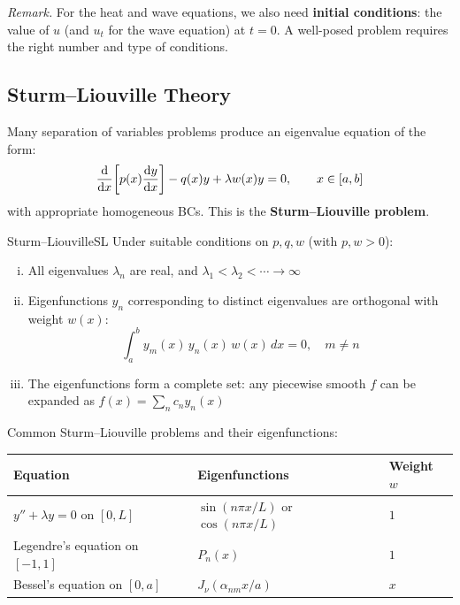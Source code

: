 \documentclass[11pt, letterpaper]{article}
\theoremstyle{plain}
\newenvironment{remark}{\smallskip\noindent\textit{Remark.}}{\smallskip}
\begin{document}
\begin{remark}
    For the heat and wave equations, we also need \textbf{initial conditions}:
    the value of $u$ (and $u_t$ for the wave equation) at $t=0$.
    A well-posed problem requires the right number and type of conditions.
\end{remark}


\subsection{Sturm--Liouville Theory}

Many separation of variables problems produce an eigenvalue equation of the form:
\[
    \dv{}{x}\!\left[p(x)\dv{y}{x}\right] - q(x)y + \lambda w(x)y = 0,
    \qquad x\in[a,b]
\]
with appropriate homogeneous BCs. This is the \textbf{Sturm--Liouville problem}.

\begin{theorem}{Sturm--Liouville}{SL}
    Under suitable conditions on $p, q, w$ (with $p, w > 0$):
    \begin{enumerate}[(i)]
        \item All eigenvalues $\lambda_n$ are real, and $\lambda_1 < \lambda_2 < \cdots \to \infty$
        \item Eigenfunctions $y_n$ corresponding to distinct eigenvalues are
              orthogonal with weight $w(x)$:
              \[
                  \int_a^b y_m(x)\,y_n(x)\,w(x)\,dx = 0, \quad m\neq n
              \]
        \item The eigenfunctions form a complete set: any piecewise smooth
              $f$ can be expanded as $f(x) = \sum_n c_n y_n(x)$
    \end{enumerate}
\end{theorem}

Common Sturm--Liouville problems and their eigenfunctions:
\begin{center}
\begin{tabular}{lll}
    \toprule
    Equation & Eigenfunctions & Weight $w$ \\
    \midrule
    $y'' + \lambda y = 0$ on $[0,L]$ & $\sin(n\pi x/L)$ or $\cos(n\pi x/L)$ & $1$ \\[4pt]
    Legendre's equation on $[-1,1]$  & $P_n(x)$ & $1$ \\[4pt]
    Bessel's equation on $[0,a]$     & $J_\nu(\alpha_{nm} x/a)$ & $x$ \\
    \bottomrule
\end{tabular}
\end{center}
\end{document}
